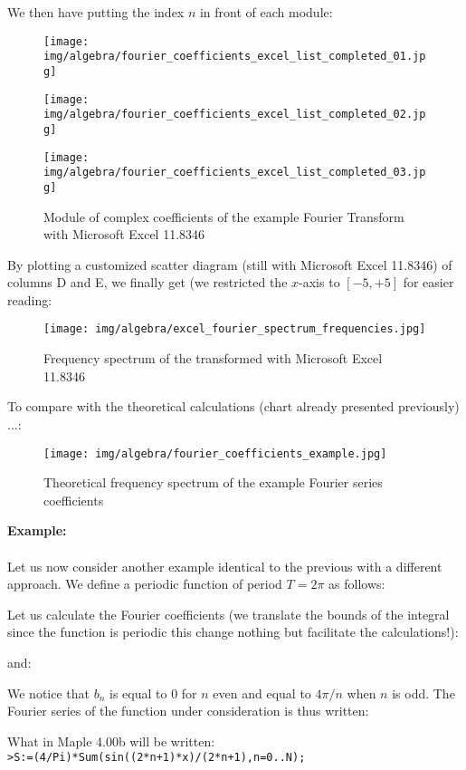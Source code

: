 	We then have putting the index $n$ in front of each module:
	\begin{figure}[H]
		\centering
		\texttt{[image: img/algebra/fourier\_coefficients\_excel\_list\_completed\_01.jpg]}
	\end{figure}
	\begin{figure}[H]
		\centering
		\texttt{[image: img/algebra/fourier\_coefficients\_excel\_list\_completed\_02.jpg]}
	\end{figure}
	\begin{figure}[H]
		\centering
		\texttt{[image: img/algebra/fourier\_coefficients\_excel\_list\_completed\_03.jpg]}
		\caption[]{Module of complex coefficients of the example Fourier Transform with Microsoft Excel 11.8346}
	\end{figure}
	By plotting a customized scatter diagram (still with  Microsoft Excel 11.8346) of columns D and E, we finally get (we restricted the $x$-axis to $[-5, +5]$ for easier reading:
	\begin{figure}[H]
		\centering
		\texttt{[image: img/algebra/excel\_fourier\_spectrum\_frequencies.jpg]}
		\caption[]{Frequency spectrum of the transformed with Microsoft Excel 11.8346}
	\end{figure}
	To compare with the theoretical calculations (chart already presented previously) ...:
	\begin{figure}[H]
		\centering
		\texttt{[image: img/algebra/fourier\_coefficients\_example.jpg]}
		\caption{Theoretical frequency spectrum of the example Fourier series coefficients}
	\end{figure}
	\begin{tcolorbox}[colframe=black,colback=white,sharp corners]
	\textbf{{\Large {}}Example:}\\\\
	Let us now consider another example identical to the previous with a different approach. We define a periodic function of period $T=2\pi$ as follows:
	
	Let us calculate the Fourier coefficients (we translate the bounds of the integral since the function is periodic this change nothing but facilitate the calculations!):
	
	and:
	
	We notice that $b_n$ is equal to $0$ for $n$ even and equal to $4\pi/n$ when $n$ is odd.
	The Fourier series of the function under consideration is thus written:
	
	What in Maple 4.00b will be written:\\
	
	\texttt{>S:=(4/Pi)*Sum(sin((2*n+1)*x)/(2*n+1),n=0..N);}
	\end{tcolorbox}
	
